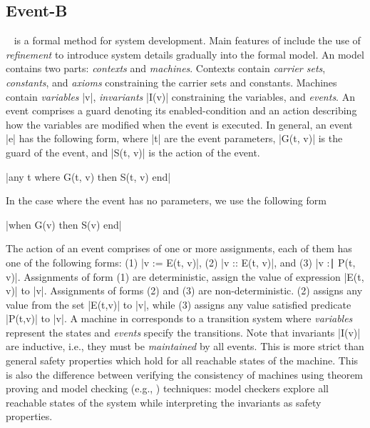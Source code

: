 
\subsection{Event-B}
\label{sec:eventb}

\EventB~\cite{abrial10:_model_event_b} is a formal method for system
development.  Main features of \EventB include the use of
\emph{refinement} to introduce system details gradually into the
formal model.  An \EventB model contains two parts: \emph{contexts} and \emph{machines}. Contexts contain \emph{carrier sets}, \emph{constants}, and \emph{axioms} constraining the carrier sets and constants.  Machines contain \emph{variables} |v|, \emph{invariants} |I(v)| constraining the variables, and \emph{events}. An event comprises a guard denoting its enabled-condition and an action describing how the variables are modified when the event is executed.  In general, an event |e| has the following form, where |t| are the event parameters, |G(t, v)| is the guard of the event, and |S(t, v)| is the action of the event.
\begin{center}
  |any t where G(t, v) then S(t, v) end|
\end{center}
In the case where the event has no parameters, we use the following form
\begin{center}
  |when G(v) then S(v) end|
\end{center}
The action of an event comprises of one or more assignments, each of them has one of the following forms: (1) |v := E(t, v)|, (2) |v :: E(t, v)|, and (3) |v :∣ P(t, v)|.  Assignments of form (1) are deterministic, assign the value of expression |E(t, v)| to |v|.  Assignments of forms (2) and (3) are non-deterministic. (2) assigns any value from the set |E(t,v)| to |v|, while (3) assigns any value satisfied predicate |P(t,v)| to |v|.
A machine in \EventB corresponds to a transition system
where \emph{variables} represent the states and \emph{events} specify
the transitions.  Note that invariants |I(v)| are inductive, i.e., they must be \emph{maintained} by all events. This is more strict than general safety properties which hold for all reachable states of the \EventB machine.  This is also the difference between verifying the consistency of \EventB machines using theorem proving and model checking (e.g., \PROB) techniques: model checkers explore all reachable states of the system while interpreting the invariants as safety properties.  

